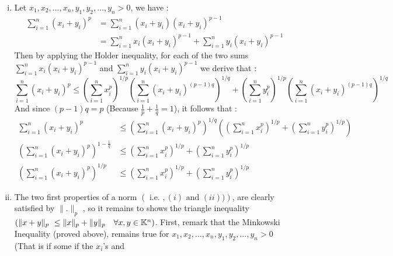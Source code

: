 \begin{enumerate}[(i)]
\item Let $x_1,x_2, ..., x_{n}, y_1,y_2, ..., y_{n}>0$,
	we have : 
	\begin{align*}
	\sum_{i=1}^{n} 
	\left( x_{i} + y_{i} \right)^{p} 
	&= 
	\sum_{i=1}^{n}  
	\left( x_{i} + y_{i} \right)
	\left( x_{i} + y_{i} \right) ^{p-1} \\
	&= 
	\sum_{i=1}^{n} 
	x_{i} \left( 
	x_{i} + y_{i}\right)^{p-1} +
	\sum_{i=1}^{n} 
	y_{i} \left( 
		x_{i} + y_{i}
	\right)^{p-1}
	\end{align*}
	Then by applying the Holder inequality,
	for each of the two sums 
	$\sum_{i=1}^{n} 
	x_{i}\left( x_{i}+ y_{i} \right)^{p-1}$  
	and 
	$\sum_{i=1}^{n} y_{i}
	\left( x_{i} + y_{i} \right)^{p-1}$  we derive
	that : 
	\[
	\sum_{i=1}^{n} 
	\left( x_{i} + y_{i} \right)^{p} \leq 
	\left( 
		\sum_{i=1}^{n} 
		x_{i}^{p}
	\right)^{1/p} 
	\left( 
		\sum_{i=1}^{n}  
		\left( x_{i} + y_{i} \right) 
		^{\left( p-1 \right)q} 
	\right)^{1/q} + 
	\left( 
		\sum_{i=1}^{n} 
		y_{i}^{p}
	\right)^{1/p} 
	\left( 
		\sum_{i=1}^{n} 
		\left( x_{i}+y_{i} \right) 
		^{\left( p-1 \right)q}
	\right)^{1/q}
	\]
	And since $\left( p-1 \right)q = p$  
	(Because $\frac{1}{p} + \frac{1}{q} = 
	1$), it follows that : 
	\begin{align*}
	\sum_{i=1}^{n} 
	\left( x_{i} + y_{i} \right)^{p} 
	& \leq 
	\left( 
		\sum_{i=1}^{n} 
		\left( x_{i} + y_{i} \right)
		^{p}
	\right)^{1/q} 
	\left(
	\left( 
		\sum_{i=1}^{n} 
		x_{i}^{p}
	\right)^{1/p}
	+ 
	\left( 
		\sum_{i=1}^{n} 
		y_{i}^{p}
	\right)^{1/p}
	\right)
	\\
	\left( 
		\sum_{i=1}^{n} 
		\left( x_{i} + y_{i} \right)^{p}
	\right)^{1 - \frac{1}{q}} & 
	\leq 
	\left( 
		\sum_{i=1}^{n} 
		x_{i}^{p}
	\right)^{1/p} + 
	\left( \sum_{i=1}^{n} 
	y_{i}^{p}\right)^{1/p} \\
		\left( 
			\sum_{i=1}^{n} 
			\left( 
			x_{i} + y_{i}\right) 
			^{p}
		\right)^{1/p} 
				  &\leq 
		\left( 
			\sum_{i=1}^{n} 
			x_{i}^{p}
		\right)^{1/p} + 
		\left( 
			\sum_{i=1}^{n} 
			y_{i}^{p}
		\right)^{1/p}
	\end{align*}
\item The two first properties of a norm
	$\left( \text{ i.e. }, (i) 
	\text{ and }  (ii)) \right)$, are clearly
	satisfied by $\| . \| _{p}$ , so it remains 
	to shows the triangle
	inequality 
	$\left( \| x+y \| _{p} \leq 
	\| x \|_{p} + \| y \| _{p} \quad 
\forall  x,y \in \KK^{n}\right)$. First, remark 
that the Minkowski Inequality (proved above), 
remains true for 
$x_1,x_2, ..., x_{n}, y_1,y_2, ..., y_{n} > 0$ (That is if
some if the $x_{i}$'s and 

\end{enumerate}

